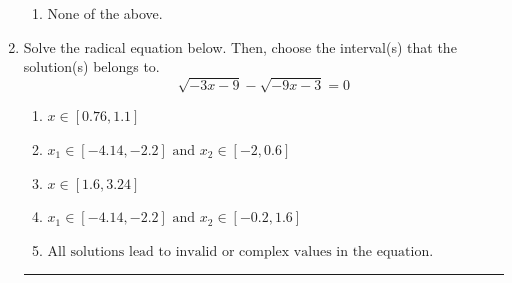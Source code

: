 \documentclass[14pt]{extbook}
\newcommand{\litem}[1]{\item#1\hspace*{-1cm}\rule{\textwidth}{0.4pt}}
\begin{document}
\begin{enumerate}
{\begin{enumerate}[label=\Alph*.]
\item None of the above.
\end{enumerate} }
\litem{
Solve the radical equation below. Then, choose the interval(s) that the solution(s) belongs to.\[ \sqrt{-3 x - 9} - \sqrt{-9 x - 3} = 0 \]\begin{enumerate}[label=\Alph*.]
\item \( x \in [0.76,1.1] \)
\item \( x_1 \in [-4.14, -2.2] \text{ and } x_2 \in [-2,0.6] \)
\item \( x \in [1.6,3.24] \)
\item \( x_1 \in [-4.14, -2.2] \text{ and } x_2 \in [-0.2,1.6] \)
\item \( \text{All solutions lead to invalid or complex values in the equation.} \)


\end{enumerate}}
\end{enumerate}
\end{document}
